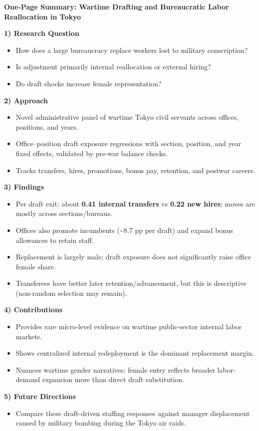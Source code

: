 \documentclass[10pt]{article}
\begin{document}
\small

{\normalsize \textbf{One-Page Summary: Wartime Drafting and Bureaucratic Labor Reallocation in Tokyo}}

\vspace{0.3em}
\textbf{1) Research Question}
\begin{itemize}
    \setlength\itemsep{0pt}
    \item How does a large bureaucracy replace workers lost to military conscription?
    \item Is adjustment primarily internal reallocation or external hiring?
    \item Do draft shocks increase female representation?
\end{itemize}

\textbf{2) Approach}
\begin{itemize}
    \setlength\itemsep{0pt}
    \item Novel administrative panel of wartime Tokyo civil servants across offices, positions, and years.
    \item Office--position draft exposure regressions with section, position, and year fixed effects, validated by pre-war balance checks.
    \item Tracks transfers, hires, promotions, bonus pay, retention, and postwar careers.
\end{itemize}

\textbf{3) Findings}
\begin{itemize}
    \setlength\itemsep{0pt}
    \item Per draft exit: about \textbf{0.41 internal transfers} vs \textbf{0.22 new hires}; moves are mostly across sections/bureaus.
    \item Offices also promote incumbents (\textasciitilde8.7 pp per draft) and expand bonus allowances to retain staff.
    \item Replacement is largely male; draft exposure does not significantly raise office female share.
    \item Transferees have better later retention/advancement, but this is descriptive (non-random selection may remain).
\end{itemize}

\textbf{4) Contributions}
\begin{itemize}
    \setlength\itemsep{0pt}
    \item Provides rare micro-level evidence on wartime public-sector internal labor markets.
    \item Shows centralized internal redeployment is the dominant replacement margin.
    \item Nuances wartime gender narratives: female entry reflects broader labor-demand expansion more than direct draft substitution.
\end{itemize}

\textbf{5) Future Directions}
\begin{itemize}
    \setlength\itemsep{0pt}
    \item Compare these draft-driven staffing responses against manager displacement caused by military bombing during the Tokyo air raids.
\end{itemize}
\end{document}
